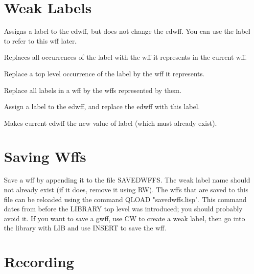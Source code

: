 \section{Weak Labels}

\begin{description} 
\item[CW]  
Assigns a label to the edwff, but does not change the edwff. You can
use the label to refer to this wff later.

\item[DELWEAK]  
Replaces all occurrences of the label with the wff it represents
in the current wff.

\item[DW]  
Replace a top level occurrence of the label by the wff it represents.

\item[DW*]  
Replace all labels in a wff by the wffs represented by them.

\item[NAME]  
Assign a label to the edwff, and replace the edwff with this label.

\item[RW]  
Makes current edwff the new value of label (which must 
already exist).
\item
\end{description}

\section{Saving Wffs}

\begin{description} 
\item[SAVE]  
Save a wff by appending it to the file SAVEDWFFS. The 
weak label name should not already exist (if it does, remove it
using RW). The wffs that are saved to this file can be reloaded
using the command QLOAD "savedwffs.lisp".
  This command dates from before the LIBRARY top level was 
introduced; you should probably avoid it. If you want to save 
a gwff, use CW to create a weak label, then go into the library
with LIB and use INSERT to save the wff.
\item
\end{description}

\section{Recording}

